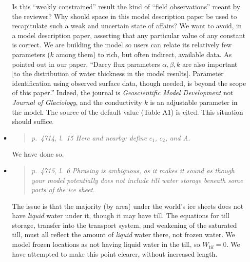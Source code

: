 \documentclass[11pt,reqno]{amsart}
\newcommand{\reply}[2]{
\medskip\medskip
\item  \begin{quote}
\emph{#1}
\end{quote}

\medskip
\noindent #2}
\begin{document}
\begin{itemize}
{Is this ``weakly constrained'' result the kind of ``field observations'' meant by the reviewer?  Why should space in this model description paper be used to recapitulate such a weak and uncertain state of affairs?  We want to avoid, in a model description paper, asserting that any particular value of any constant is correct.  We are building the model so users can relate its relatively few parameters ($k$ among them) to rich, but often indirect, available data.  As pointed out in our paper, ``Darcy flux parameters $\alpha,\beta,k$ are also important [to the distribution of water thickness in the model results].  Parameter identification using observed surface data, though needed, is beyond the scope of this paper.''  Indeed, the journal is \emph{Geoscientific Model Development} not \emph{Journal of Glaciology}, and the conductivity $k$ is an adjustable parameter in the model.  The source of the default value (Table A1) is cited.  This situation should suffice.}

\reply{p.~4714, l.~15 Here and nearby: define $c_1$, $c_2$, and A.}
{We have done so.}

\reply{p.~4715, l.~6 Phrasing is ambiguous, as it makes it sound as though your model
potentially does not include till water storage beneath some parts of the ice sheet.}
{The issue is that the majority (by area) under the world's ice sheets does not have \emph{liquid} water under it, though it may have till.  The equations for till storage, transfer into the transport system, and weakening of the saturated till, must all reflect the amount of \emph{liquid} water there, not frozen water.  We model frozen locations as not having liquid water in the till, so $W_{til}=0$.  We have attempted to make this point clearer, without increased length.}


\end{itemize}
\end{document}

